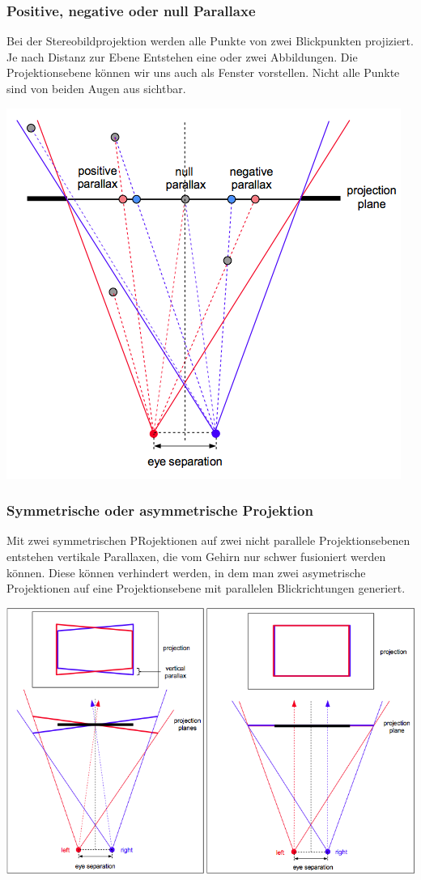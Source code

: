 \documentclass[10pt]{article}
\begin{document}
\subsubsection{Positive, negative oder null Parallaxe}
Bei der Stereobildprojektion werden alle Punkte von zwei Blickpunkten projiziert. Je nach Distanz zur Ebene Entstehen eine oder zwei Abbildungen.  Die Projektionsebene können wir uns auch als Fenster vorstellen. Nicht alle Punkte sind von beiden Augen aus sichtbar.
\begin{center}
	\includegraphics[scale=0.3]{projektiosnparallaxe.png}
\end{center}
\subsubsection{Symmetrische oder asymmetrische Projektion}
Mit zwei symmetrischen PRojektionen auf zwei nicht parallele Projektionsebenen entstehen vertikale Parallaxen, die vom Gehirn nur schwer fusioniert werden können. Diese können verhindert werden, in dem man zwei asymetrische Projektionen auf eine Projektionsebene mit parallelen Blickrichtungen generiert.
\begin{center}
	\includegraphics[scale=0.3]{asym-projektion.png}
\end{center}
\end{document}
